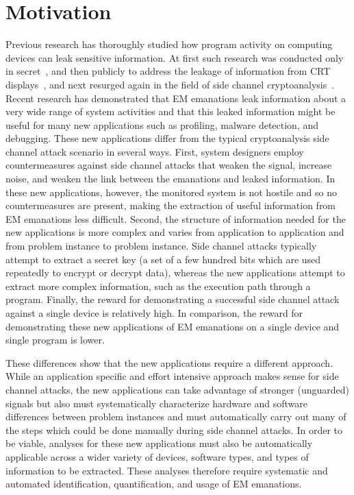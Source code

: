 \section{Motivation}
Previous research has thoroughly studied how program activity on computing devices can leak sensitive information. At first such research was conducted only in secret~\cite{Khun03}, and then publicly to address the leakage of information from CRT displays~\cite{Eck85}, and next resurged again in the field of side channel cryptoanalysis~\cite{Kocher99}. Recent research has demonstrated that EM emanations leak information about a very wide range of system activities and that this leaked information might be useful for many new applications such as profiling, malware detection, and debugging. These new applications differ from the typical cryptoanalysis side channel attack scenario in several ways. First, system designers employ countermeasures against side channel attacks that weaken the signal, increase noise, and weaken the link between the emanations and leaked information. In these new applications, however, the monitored system is not hostile and so no countermeasures are present, making the extraction of useful information from EM emanations less difficult. Second, the structure of information needed for the new applications is more complex and varies from application to application and from problem instance to problem instance. Side channel attacks typically attempt to extract a secret key (a set of a few hundred bits which are used repeatedly to encrypt or decrypt data), whereas the new applications attempt to extract more complex information, such as the execution path through a program. Finally, the reward for demonstrating a successful side channel attack against a single device is relatively high. In comparison, the reward for demonstrating these new applications of EM emanations on a single device and single program is lower. 

These differences show that the new applications require a different approach. While an application specific and effort intensive approach makes sense for side channel attacks, the new applications can take advantage of stronger (unguarded) signals but also must systematically characterize hardware and software differences between problem instances and must automatically carry out many of the steps which could be done manually during side channel attacks. In order to be viable, analyses for these new applications must also be automatically applicable across a wider variety of devices, software types, and types of information to be extracted. These analyses therefore require systematic and automated identification, quantification, and usage of EM emanations. 

